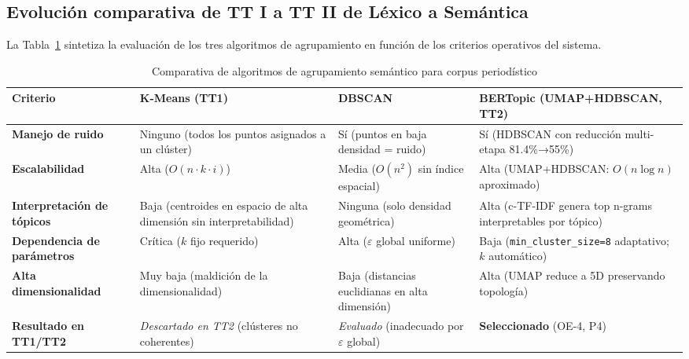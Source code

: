 \subsection{Evolución comparativa de TT I a TT II de Léxico a Semántica}
\label{subsec:ea_evolucion_clustering}

La Tabla~\ref{tab:comparativa_clustering} sintetiza la evaluación de los tres
algoritmos de agrupamiento en función de los criterios operativos del sistema.

\vspace{0.5cm}
\begin{table}[htbp]
\centering
\caption{Comparativa de algoritmos de agrupamiento semántico para corpus periodístico}
\label{tab:comparativa_clustering}
\begin{tabular}{|p{2.8cm}|p{2.8cm}|p{2.8cm}|p{3.0cm}|}
\hline
\textbf{Criterio} &
\textbf{K-Means} \newline (TT1) &
\textbf{DBSCAN} &
\textbf{BERTopic} \newline (UMAP+HDBSCAN, TT2) \\
\hline
\textbf{Manejo de ruido} &
Ninguno (todos los puntos asignados a un clúster) &
Sí (puntos en baja densidad = ruido) &
Sí (HDBSCAN con reducción multi-etapa 81.4\%→55\%) \\
\hline
\textbf{Escalabilidad} &
Alta ($O(n \cdot k \cdot i)$) &
Media ($O(n^2)$ sin índice espacial) &
Alta (UMAP+HDBSCAN: $O(n \log n)$ aproximado) \\
\hline
\textbf{Interpretación de tópicos} &
Baja (centroides en espacio de alta dimensión sin interpretabilidad) &
Ninguna (solo densidad geométrica) &
Alta (c-TF-IDF genera top n-grams interpretables por tópico) \\
\hline
\textbf{Dependencia de parámetros} &
Crítica ($k$ fijo requerido) &
Alta ($\varepsilon$ global uniforme) &
Baja (\texttt{min\_cluster\_size=8} adaptativo; $k$ automático) \\
\hline
\textbf{Alta dimensionalidad} &
Muy baja (maldición de la dimensionalidad) &
Baja (distancias euclidianas en alta dimensión) &
Alta (UMAP reduce a 5D preservando topología) \\
\hline
\textbf{Resultado en TT1/TT2} &
\textit{Descartado en TT2} (clústeres no coherentes) &
\textit{Evaluado} (inadecuado por $\varepsilon$ global) &
\textbf{Seleccionado} (OE-4, P4) \\
\hline
\end{tabular}
\end{table}
\vspace{0.4cm}

